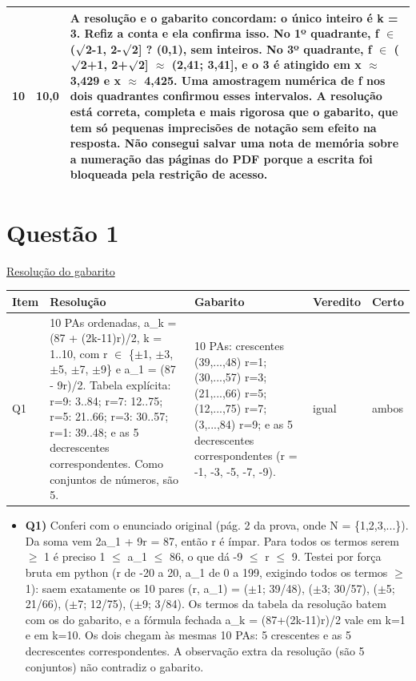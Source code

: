 \documentclass{article}%
\begin{document}
\begin{longtable}{@{}c c p{}@{}}
10 & 10,0 & A resolução e o gabarito concordam: o único inteiro é k = 3. Refiz a conta e ela confirma isso. No 1º quadrante, f $\in$ ($\surd$2-1, 2-$\surd$2{]} ? (0,1), sem inteiros. No 3º quadrante, f $\in$ ($\surd$2+1, 2+$\surd$2{]} $\approx$ (2,41; 3,41{]}, e o 3 é atingido em x $\approx$ 3,429 e x $\approx$ 4,425. Uma amostragem numérica de f nos dois quadrantes confirmou esses intervalos. A resolução está correta, completa e mais rigorosa que o gabarito, que tem só pequenas imprecisões de notação sem efeito na resposta. Não consegui salvar uma nota de memória sobre a numeração das páginas do PDF porque a escrita foi bloqueada pela restrição de acesso. \\
\bottomrule\end{longtable}%
\section*{Questão 1}%
\href{https://poliedroresolve.sistemapoliedro.com.br/vestibulares/ita/2027/ita-2-fase-dia-1-20-10-2026-2-fase-dia-1/dissertativa-1-matematica-2-fase-dia-1-ita-2027}{Resolução do gabarito}\par\smallskip%
\begin{longtable}{@{}p{} p{} p{} p{} p{}@{}}\toprule Item & Resolução & Gabarito & Veredito & Certo \\ \midrule
Q1 & 10 PAs ordenadas, a\_k = (87 + (2k-11)r)/2, k = 1..10, com r $\in$ \{$\pm$1, $\pm$3, $\pm$5, $\pm$7, $\pm$9\} e a\_1 = (87 - 9r)/2. Tabela explícita: r=9: 3..84; r=7: 12..75; r=5: 21..66; r=3: 30..57; r=1: 39..48; e as 5 decrescentes correspondentes. Como conjuntos de números, são 5. & 10 PAs: crescentes (39,...,48) r=1; (30,...,57) r=3; (21,...,66) r=5; (12,...,75) r=7; (3,...,84) r=9; e as 5 decrescentes correspondentes (r = -1, -3, -5, -7, -9). & igual & ambos \\
\bottomrule\end{longtable}%
\begin{itemize}%
\item%
\textbf{Q1)} Conferi com o enunciado original (pág. 2 da prova, onde N = \{1,2,3,...\}). Da soma vem 2a\_1 + 9r = 87, então r é ímpar. Para todos os termos serem $\geq$ 1 é preciso 1 $\leq$ a\_1 $\leq$ 86, o que dá -9 $\leq$ r $\leq$ 9. Testei por força bruta em python (r de -20 a 20, a\_1 de 0 a 199, exigindo todos os termos $\geq$ 1): saem exatamente os 10 pares (r, a\_1) = ($\pm$1; 39/48), ($\pm$3; 30/57), ($\pm$5; 21/66), ($\pm$7; 12/75), ($\pm$9; 3/84). Os termos da tabela da resolução batem com os do gabarito, e a fórmula fechada a\_k = (87+(2k-11)r)/2 vale em k=1 e em k=10. Os dois chegam às mesmas 10 PAs: 5 crescentes e as 5 decrescentes correspondentes. A observação extra da resolução (são 5 conjuntos) não contradiz o gabarito.%
\end{itemize}%
\end{document}
